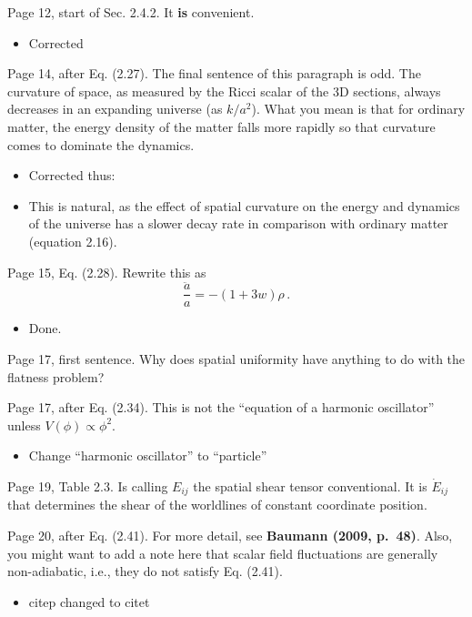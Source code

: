 \documentclass[11pt]{article}
\newcommand{\todo}[1]{{\color{red} #1}}
\begin{document}
\begin{enumerate}
\item Page 12, start of Sec. 2.4.2. It \textbf{is} convenient.
  \begin{itemize}
    \item Corrected
  \end{itemize}
\item Page 14, after Eq. (2.27). The final sentence of this paragraph
  is odd. The curvature of space, as measured by the Ricci scalar of
  the 3D sections, always decreases in an expanding universe (as
  $k/a^2$). What you mean is that for ordinary matter, the energy
  density of the matter falls more rapidly so that curvature comes to
  dominate the dynamics.
  \begin{itemize}
    \item Corrected thus:
    \item This is natural, as the effect of spatial curvature on the energy and dynamics of the universe has a slower decay rate in comparison with ordinary matter (equation 2.16).
  \end{itemize}
\item Page 15, Eq. (2.28). Rewrite this as 
%
\begin{equation}
\frac{\ddot{a}}{a} = - (1+3w) \rho \, . \tag{2.28}
\end{equation}
%
\begin{itemize}
  \item Done.
\end{itemize}
\todo{
\item Page 17, first sentence. Why does spatial uniformity have
  anything to do with the flatness problem?
}
\item Page 17, after Eq. (2.34). This is not the ``equation of a
  harmonic oscillator'' unless $V(\phi) \propto \phi^2$.
  \begin{itemize}
    \item Change ``harmonic oscillator'' to ``particle''
  \end{itemize}
  \todo{
\item Page 19, Table 2.3. Is calling $E_{ij}$ the spatial shear tensor
  conventional. It is $\dot{E}_{ij}$ that determines the shear of the
  worldlines of constant coordinate position.
}
\item Page 20, after Eq. (2.41). For more detail, see \textbf{Baumann
    (2009, p.~48)}. Also, you might want to add a note here that
  scalar field fluctuations are generally non-adiabatic, i.e., they do
  not satisfy Eq. (2.41).
  \begin{itemize}
    \item citep changed to citet

\end{itemize}
\end{enumerate}
\end{document}

